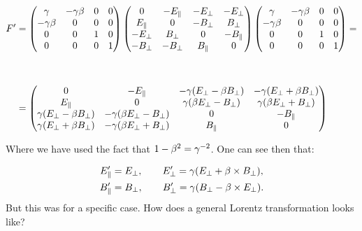 \begin{equation}
	\begin{split}
		F' &= \begin{pmatrix}
			\gamma & -\gamma\beta & 0 & 0\\
			-\gamma\beta  &0 & 0 & 0\\
			0  &0& 1 & 0\\
			0  & 0 & 0 & 1 \\
		\end{pmatrix}
		\begin{pmatrix}
			0 & -E_{\parallel} & -E_{\perp} & -E_{\perp}\\
			E_{\parallel}  &0 & -B_{\perp} & B_{\perp}\\
			-E_{\perp}  &B_{\perp}& 0 & -B_{\parallel}\\
			-B_{\perp} & -B_{\perp} & B_{\parallel}& 0\\
		\end{pmatrix}
		\begin{pmatrix}
			\gamma & -\gamma\beta & 0 & 0\\
			-\gamma\beta  &0 & 0 & 0\\
			0  &0& 1 & 0\\
			0  & 0 & 0 & 1 \\
		\end{pmatrix}=\\
		&\\
		&\\
		&= \begin{pmatrix}
			0 & -E_{\parallel} & -\gamma(E_{\perp} - \beta B_{\perp}) & -\gamma(E_{\perp} + \beta B_{\perp})\\
			E_{\parallel}  &0 & \gamma(\beta E_{\perp} - B_{\perp}) & \gamma(\beta E_{\perp} + B_{\perp})\\
			\gamma(E_{\perp} - \beta B_{\perp})  & -\gamma(\beta E_{\perp} - B_{\perp})& 0 & -B_{\parallel}\\
			\gamma(E_{\perp} + \beta B_{\perp})  & -\gamma(\beta E_{\perp} + B_{\perp}) & B_{\parallel}& 0\\
		\end{pmatrix}
	\end{split}
\end{equation}

Where we have used the fact that $1-\beta^{2} = \gamma^{-2}$. One can see then that:

\begin{equation}\label{booste1dir}
	\begin{split}
		E_{\parallel}' &= E_{\perp}, \quad \quad E_{\perp}'= \gamma (E_{\perp} + \beta \times B_{\perp}),\\
		B_{\parallel}' &= B_{\perp}, \quad \quad B_{\perp}'= \gamma (B_{\perp} - \beta \times E_{\perp}).\\
	\end{split}
\end{equation}
But this was for a specific case. How does a general Lorentz transformation looks like?

